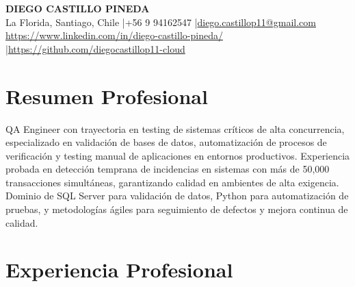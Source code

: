 \documentclass[11pt,letterpaper]{article}
\begin{document}
\begin{center}
{\fontsize{16}{19}\selectfont\textbf{\MakeUppercase{Diego Castillo Pineda}}}\\[4pt]
{\small La Florida, Santiago, Chile \quad|\quad +56 9 94162547 \quad|\quad \href{mailto:diego.castillop11@gmail.com}{diego.castillop11@gmail.com}\\
\href{https://https://www.linkedin.com/in/diego-castillo-pineda/}{https://www.linkedin.com/in/diego-castillo-pineda/} \quad|\quad \href{https://https://github.com/diegocastillop11-cloud}{https://github.com/diegocastillop11-cloud}}
\end{center}

\section{Resumen Profesional}
QA Engineer con trayectoria en testing de sistemas críticos de alta concurrencia, especializado en validación de bases de datos, automatización de procesos de verificación y testing manual de aplicaciones en entornos productivos. Experiencia probada en detección temprana de incidencias en sistemas con más de 50,000 transacciones simultáneas, garantizando calidad en ambientes de alta exigencia. Dominio de SQL Server para validación de datos, Python para automatización de pruebas, y metodologías ágiles para seguimiento de defectos y mejora continua de calidad.

\section{Experiencia Profesional}
\end{document}
